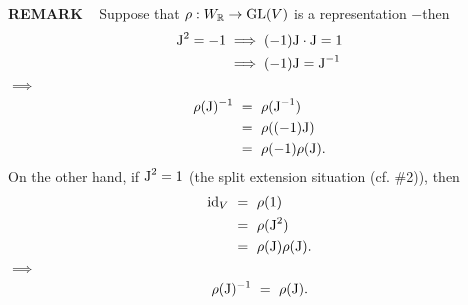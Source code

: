 \vspace{0.1cm}
\begin{x}{\small\bf REMARK} \ %
Suppose that $\rho:W_{\mathbb{R}} \rightarrow \text{GL}(V)$ is a representation $-$then 
\begin{align*}
\text{J}^2 = -1 
&\implies  (-1) \text{J} \cdot \text{J} = 1\\
&\implies (-1) \text{J}  = \text{J}^{-1}
\end{align*}
\qquad\qquad\qquad\qquad $\implies$ 
\begin{align*}
\rho(\tJ)^{-1}\ 
&= \ \rho(\tJ^{-1})\\
&= \ \rho((-1)\tJ)\\
&= \ \rho(-1)\rho(\tJ).
\end{align*}
On the other hand, if $\text{J}^2 = 1$ (the split extension situation (cf. \#2)), then 
\begin{align*}
\id_V \ 
&= \  \rho(1) \\
&= \ \rho(\tJ^2)\\
&=\ \rho(\tJ)\rho(\tJ).
\end{align*}
\qquad\qquad\qquad\qquad $\implies$ 
\[
\rho(\tJ)^{-1} \ = \ \rho(\tJ).
\]
\end{x}
\vspace{0.1cm}





















